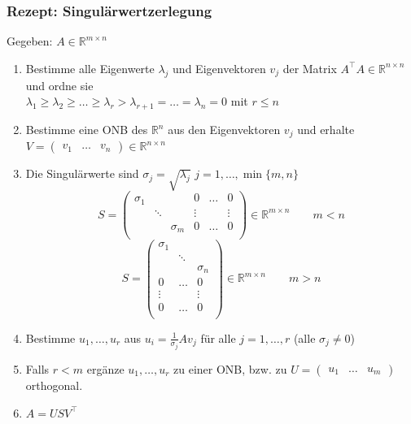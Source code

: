 \documentclass[6pt,a4paper]{scrartcl}
\begin{document}
\begin{multicols*}{4}
\subsubsection{Rezept: Singulärwertzerlegung}
Gegeben: $A\in \mathbb{R}^{m\times n}$
\begin{enumerate}\itemsep0pt
\item Bestimme alle Eigenwerte $\lambda_j$ und Eigenvektoren $v_j$ der Matrix $A^\top A\in \mathbb{R}^{n\times n}$ und ordne sie \\ $\lambda_1\ge\lambda_2\ge \dots \ge \lambda_r>\lambda_{r+1}=\dots=\lambda_n=0$ mit $r\le n$
\item Bestimme eine ONB des $\mathbb{R}^n$ aus den Eigenvektoren $v_j$ und erhalte $V=\begin{pmatrix} 
v_1 &\dots & v_n
\end{pmatrix} \in \mathbb{R}^{n\times n}$
\item Die Singulärwerte sind $\sigma_j=\sqrt{\lambda_j}$ \qquad $j=1,\dots,\min\{m,n\}$
\begin{equation*}
S=\begin{pmatrix}
\sigma_1 & & & 0 & \dots & 0\\
 & \ddots & &  \vdots &  &  \vdots\\
& & \sigma_m & 0 & \dots & 0\\
\end{pmatrix} \in \mathbb{R}^{m\times n}
\qquad m<n
\end{equation*}
\begin{equation*}
S=\begin{pmatrix}
\sigma_1 & & \\
 & \ddots & \\
& & \sigma_n \\
0 & \dots & 0\\
\vdots &  &  \vdots\\
0 & \dots & 0\\
\end{pmatrix} \in \mathbb{R}^{m\times n}
\qquad m>n
\end{equation*}
\item Bestimme $u_1,\dots,u_r$ aus $u_i=\frac{1}{\sigma_j}Av_j$ für alle $j=1,\dots,r$ (alle $\sigma_j\ne 0$)
\item Falls $r<m$ ergänze $u_1,\dots,u_r$ zu einer ONB, bzw. zu $U=\begin{pmatrix}
u_1 & \dots & u_m
\end{pmatrix}$
orthogonal.
\item $A=USV^\top$
\end{enumerate}


\end{multicols*}
\end{document}

